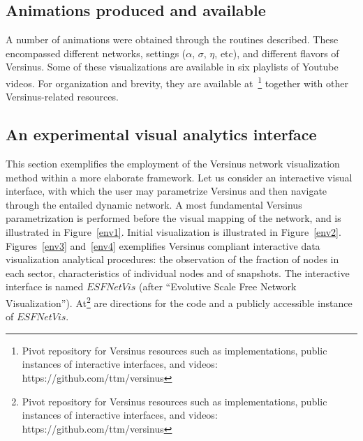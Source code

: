 \documentclass[runningheads]{llncs}
\begin{document}
\subsection{Animations produced and available}\label{sec:vid}
A number of animations were obtained through the routines described.
These encompassed different networks, settings ($\alpha$, $\sigma$, $\eta$,
etc), and different flavors of Versinus.
Some of these visualizations are available in six playlists of Youtube videos.
For organization and brevity, they are available at~\footnote{Pivot repository for Versinus resources such as implementations, public instances of interactive interfaces, and videos: https://github.com/ttm/versinus} together with other Versinus-related resources.

\subsection{An experimental visual analytics interface}
This section exemplifies the employment of the Versinus network visualization method
within a more elaborate framework.
Let us consider an interactive visual interface, with which the user may parametrize Versinus and then navigate through the entailed dynamic network.
A most fundamental Versinus parametrization is performed before the visual mapping of the network, and is illustrated in Figure~\ref{env1}.
Initial visualization is illustrated in Figure~\ref{env2}.
Figures~\ref{env3} and~\ref{env4} exemplifies Versinus compliant interactive data visualization analytical procedures: the observation of the fraction of nodes in each sector, characteristics of individual nodes and of snapshots.
The interactive interface is named $ESFNetVis$ (after ``Evolutive Scale Free Network Visualization''). At\footnote{Pivot repository for Versinus resources such as implementations, public instances of interactive interfaces, and videos: https://github.com/ttm/versinus} are directions for the code and a publicly accessible instance of $ESFNetVis$.
\end{document}

